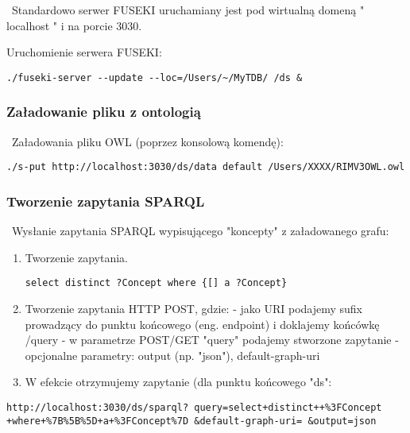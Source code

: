~Standardowo serwer FUSEKI uruchamiany jest pod wirtualną domeną " localhost " i na porcie 3030.

Uruchomienie serwera FUSEKI:
\begin{lstlisting}
./fuseki-server --update --loc=/Users/~/MyTDB/ /ds &
\end{lstlisting}

\subsubsection{Załadowanie pliku z ontologią}

~Załadowania pliku OWL (poprzez konsolową komendę):

\begin{lstlisting}
./s-put http://localhost:3030/ds/data default /Users/XXXX/RIMV3OWL.owl
\end{lstlisting}

\subsubsection{Tworzenie zapytania SPARQL}

~Wysłanie zapytania SPARQL wypisującego "koncepty" z załadowanego grafu:

\begin{enumerate}
\item Tworzenie zapytania.
\begin{lstlisting}
select distinct ?Concept where {[] a ?Concept}
\end{lstlisting}
\item Tworzenie zapytania HTTP POST, gdzie:
- jako URI podajemy sufix prowadzący do punktu końcowego (eng. endpoint) i doklajemy końcówkę /query
- w parametrze POST/GET "query" podajemy stworzone zapytanie 
- opcjonalne parametry: output (np. "json"), default-graph-uri
\item W efekcie otrzymujemy zapytanie (dla punktu końcowego "ds":
\end{enumerate}

\begin{lstlisting}
http://localhost:3030/ds/sparql? query=select+distinct++%3FConcept +where+%7B%5B%5D+a+%3FConcept%7D &default-graph-uri= &output=json
\end{lstlisting}
